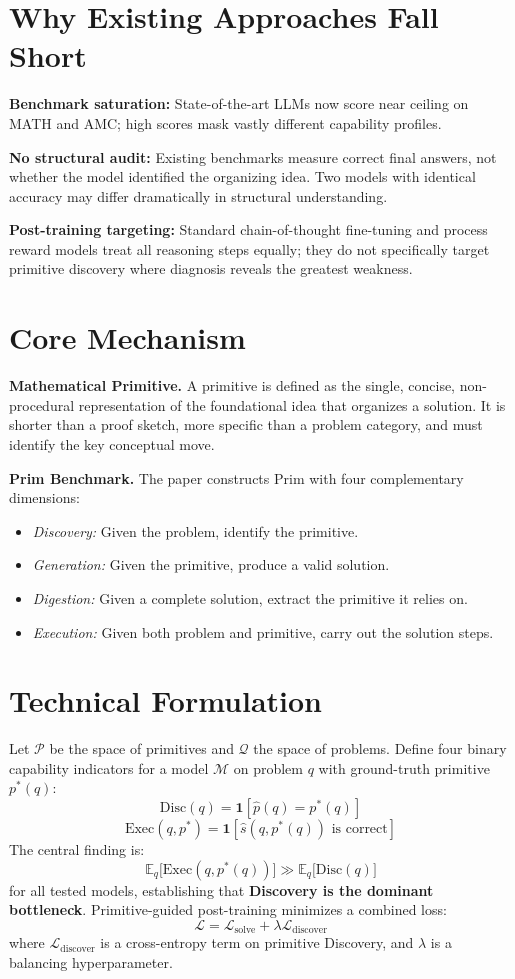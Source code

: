 \documentclass[10pt,twocolumn]{article}
\begin{document}
\section{Why Existing Approaches Fall Short}

\textbf{Benchmark saturation:} State-of-the-art LLMs now score near ceiling on MATH and
AMC; high scores mask vastly different capability profiles.

\textbf{No structural audit:} Existing benchmarks measure correct final answers, not whether
the model identified the organizing idea. Two models with identical accuracy may differ
dramatically in structural understanding.

\textbf{Post-training targeting:} Standard chain-of-thought fine-tuning and process reward
models treat all reasoning steps equally; they do not specifically target primitive
discovery where diagnosis reveals the greatest weakness.

\section{Core Mechanism}

\textbf{Mathematical Primitive.} A primitive is defined as the single, concise, non-procedural
representation of the foundational idea that organizes a solution. It is shorter than a proof
sketch, more specific than a problem category, and must identify the key conceptual move.

\textbf{Prim Benchmark.} The paper constructs Prim with four complementary dimensions:
\begin{itemize}[itemsep=2pt,parsep=0pt]
  \item \emph{Discovery:} Given the problem, identify the primitive.
  \item \emph{Generation:} Given the primitive, produce a valid solution.
  \item \emph{Digestion:} Given a complete solution, extract the primitive it relies on.
  \item \emph{Execution:} Given both problem and primitive, carry out the solution steps.
\end{itemize}

\section{Technical Formulation}

Let $\mathcal{P}$ be the space of primitives and $\mathcal{Q}$ the space of problems.
Define four binary capability indicators for a model $\mathcal{M}$ on problem $q$ with
ground-truth primitive $p^*(q)$:
\[
\text{Disc}(q) = \mathbf{1}[\hat{p}(q) = p^*(q)]
\]
\[
\text{Exec}(q,p^*) = \mathbf{1}[\hat{s}(q,p^*(q))\text{ is correct}]
\]
The central finding is:
\[
\mathbb{E}_q\bigl[\text{Exec}(q,p^*(q))\bigr] \gg \mathbb{E}_q\bigl[\text{Disc}(q)\bigr]
\]
for all tested models, establishing that \textbf{Discovery is the dominant bottleneck}.
Primitive-guided post-training minimizes a combined loss:
\[
\mathcal{L} = \mathcal{L}_{\text{solve}} + \lambda \mathcal{L}_{\text{discover}}
\]
where $\mathcal{L}_{\text{discover}}$ is a cross-entropy term on primitive Discovery, and
$\lambda$ is a balancing hyperparameter.
\end{document}
